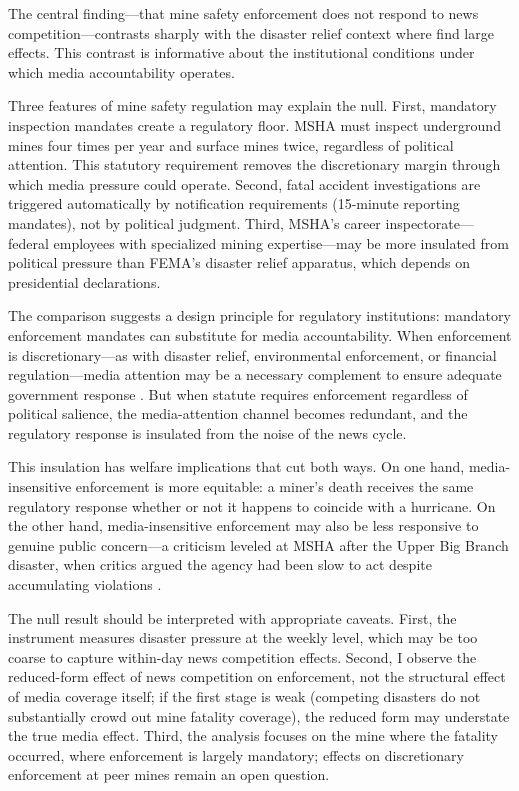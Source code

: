 \documentclass[12pt]{article}
\begin{document}
The central finding---that mine safety enforcement does not respond to news competition---contrasts sharply with the disaster relief context where \citet{eisensee2007news} find large effects. This contrast is informative about the institutional conditions under which media accountability operates.

Three features of mine safety regulation may explain the null. First, mandatory inspection mandates create a regulatory floor. MSHA must inspect underground mines four times per year and surface mines twice, regardless of political attention. This statutory requirement removes the discretionary margin through which media pressure could operate. Second, fatal accident investigations are triggered automatically by notification requirements (15-minute reporting mandates), not by political judgment. Third, MSHA's career inspectorate---federal employees with specialized mining expertise---may be more insulated from political pressure than FEMA's disaster relief apparatus, which depends on presidential declarations.

The comparison suggests a design principle for regulatory institutions: mandatory enforcement mandates can substitute for media accountability. When enforcement is discretionary---as with disaster relief, environmental enforcement, or financial regulation---media attention may be a necessary complement to ensure adequate government response \citep{besley2006handcuffs, johnson2020regulatory}. But when statute requires enforcement regardless of political salience, the media-attention channel becomes redundant, and the regulatory response is insulated from the noise of the news cycle.

This insulation has welfare implications that cut both ways. On one hand, media-insensitive enforcement is more equitable: a miner's death receives the same regulatory response whether or not it happens to coincide with a hurricane. On the other hand, media-insensitive enforcement may also be less responsive to genuine public concern---a criticism leveled at MSHA after the Upper Big Branch disaster, when critics argued the agency had been slow to act despite accumulating violations \citep{morantz2013coal}.

The null result should be interpreted with appropriate caveats. First, the instrument measures disaster pressure at the weekly level, which may be too coarse to capture within-day news competition effects. Second, I observe the reduced-form effect of news competition on enforcement, not the structural effect of media coverage itself; if the first stage is weak (competing disasters do not substantially crowd out mine fatality coverage), the reduced form may understate the true media effect. Third, the analysis focuses on the mine where the fatality occurred, where enforcement is largely mandatory; effects on discretionary enforcement at peer mines remain an open question.
\end{document}
